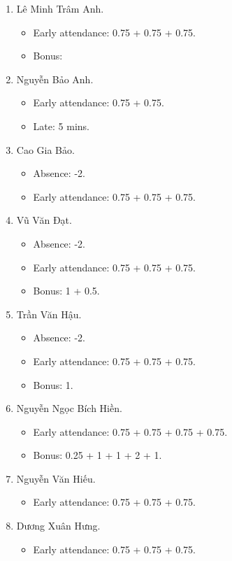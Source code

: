 \documentclass{article}
\begin{document}
\begin{enumerate}
	\item {\sc Lê Minh Trâm Anh.}
	\begin{itemize}
		\item Early attendance: 0.75 + 0.75 + 0.75.
		\item Bonus: 
	\end{itemize}
	\item {\sc Nguyễn Bảo Anh.}
	\begin{itemize}
		\item Early attendance: 0.75  + 0.75.
		\item Late: 5 mins.
	\end{itemize}
	\item {\sc Cao Gia Bảo.}
	\begin{itemize}
		\item Absence: -2.
		\item Early attendance: 0.75 + 0.75 + 0.75.
	\end{itemize}
	\item {\sc Vũ Văn Đạt.}
	\begin{itemize}
		\item Absence: -2.
		\item Early attendance: 0.75 + 0.75 + 0.75.
		\item Bonus: 1 + 0.5.
	\end{itemize}
	\item {\sc Trần Văn Hậu.}
	\begin{itemize}
		\item Absence: -2.
		\item Early attendance: 0.75 + 0.75 + 0.75.
		\item Bonus: 1.
	\end{itemize}
	\item {\sc Nguyễn Ngọc Bích Hiền.}
	\begin{itemize}
		\item Early attendance: 0.75 + 0.75 + 0.75 + 0.75.
		\item Bonus: 0.25 + 1 + 1 + 2 + 1.
	\end{itemize}
	\item {\sc Nguyễn Văn Hiếu.}
	\begin{itemize}
		\item Early attendance: 0.75 + 0.75 + 0.75.
	\end{itemize}
	\item {\sc Dương Xuân Hưng.}
	\begin{itemize}
		\item Early attendance: 0.75 + 0.75 + 0.75.

\end{itemize}
\end{enumerate}
\end{document}
